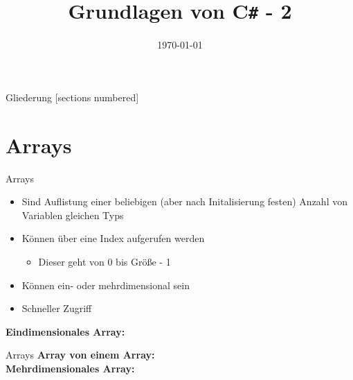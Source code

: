 



\title{Grundlagen von C\texttt{\#} - 2}
\date{\today}




\maketitle

\begin{frame}{Gliederung}
	[sections numbered]
	\tableofcontents
\end{frame}

\section{Arrays}
\begin{frame}{Arrays}
	\begin{itemize}
		\item Sind Auflistung einer beliebigen (aber nach Initalisierung festen) Anzahl von Variablen gleichen Typs
		\item Können über eine Index aufgerufen werden
		\begin{itemize}
			\item Dieser geht von 0 bis Größe - 1
		\end{itemize}
		\item Können ein- oder mehrdimensional sein
		\item Schneller Zugriff
	\end{itemize}
	\textbf{Eindimensionales Array:}\\
		
\end{frame}

\begin{frame}{Arrays}
	\textbf{Array von einem Array:}\\
	
	\textbf{Mehrdimensionales Array:}\\
		
\end{frame}

